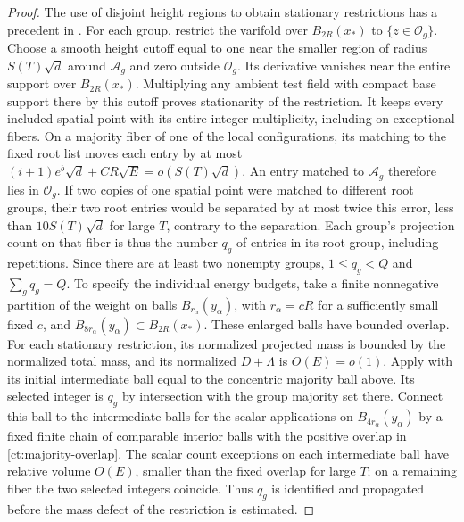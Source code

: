 \begin{proof}
The use of disjoint height regions to obtain stationary restrictions
has a precedent in \cite[Section~3.1]{BDD2025}. For each group, restrict
the varifold over $B_{2R}(x_*)$ to $\{z\in\mathcal O_g\}$. Choose a
smooth height cutoff equal to one near the smaller region of radius
$S(T)\sqrt d$ around $\mathcal A_g$ and zero outside $\mathcal O_g$.
Its derivative vanishes near the entire support over $B_{2R}(x_*)$.
Multiplying any ambient test field with compact base support there by
this cutoff proves stationarity of the restriction. It keeps every
included spatial point with
its entire integer multiplicity, including on exceptional fibers.
On a majority fiber of one of the local configurations, its matching
to the fixed root list moves each entry by at most
$(i+1)e^b\sqrt d+CR\sqrt E=o(S(T)\sqrt d)$. An entry matched to
$\mathcal A_g$ therefore lies in $\mathcal O_g$. If two copies of one
spatial point were matched to different root groups, their two root
entries would be separated by at most twice this error, less than
$10S(T)\sqrt d$ for large $T$, contrary to the separation.
Each group's projection count on that fiber is thus
the number $q_g$ of entries in its root group, including repetitions.
Since there are at least two nonempty groups,
$1\le q_g<Q$ and $\sum_gq_g=Q$. To specify the individual energy budgets,
take a finite nonnegative partition of the weight on balls
$B_{r_\alpha}(y_\alpha)$, with $r_\alpha=cR$ for a sufficiently small
fixed $c$, and $B_{8r_\alpha}(y_\alpha)\subset B_{2R}(x_*)$.
These enlarged balls have bounded overlap. For each stationary
restriction, its normalized projected mass is bounded by the normalized total
mass, and its normalized $D+\Lambda$ is $O(E)=o(1)$. Apply
 with its initial intermediate ball equal to the
concentric majority ball above. Its selected integer is $q_g$ by
intersection with the group majority set there. Connect this ball to
the intermediate balls for the scalar applications on
$B_{4r_\alpha}(y_\alpha)$ by a fixed finite chain of comparable
interior balls with the positive overlap in \eqref{ct:majority-overlap}.
The scalar count exceptions on each intermediate ball have relative
volume $O(E)$, smaller than the fixed overlap for
large $T$; on a remaining fiber the two selected integers coincide.
Thus $q_g$ is identified and propagated before the mass defect of the
restriction is estimated.


\end{proof}
